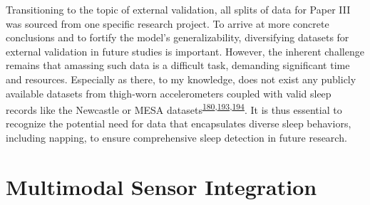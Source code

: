 \documentclass[
  10pt,
]{scrbook}
\begin{document}
Transitioning to the topic of external validation, all splits of data
for Paper III was sourced from one specific research project. To arrive
at more concrete conclusions and to fortify the model's
generalizability, diversifying datasets for external validation in
future studies is important. However, the inherent challenge remains
that amassing such data is a difficult task, demanding significant time
and resources. Especially as there, to my knowledge, does not exist any
publicly available datasets from thigh-worn accelerometers coupled with
valid sleep records like the Newcastle or MESA
datasets\textsuperscript{\protect\hyperlink{ref-hees_newcastle_2018}{180},\protect\hyperlink{ref-zhang_2018}{193},\protect\hyperlink{ref-chen_2015}{194}}.
It is thus essential to recognize the potential need for data that
encapsulates diverse sleep behaviors, including napping, to ensure
comprehensive sleep detection in future research.

\hypertarget{multimodal-sensor-integration}{%
\section{Multimodal Sensor
Integration}\label{multimodal-sensor-integration}}
\end{document}
